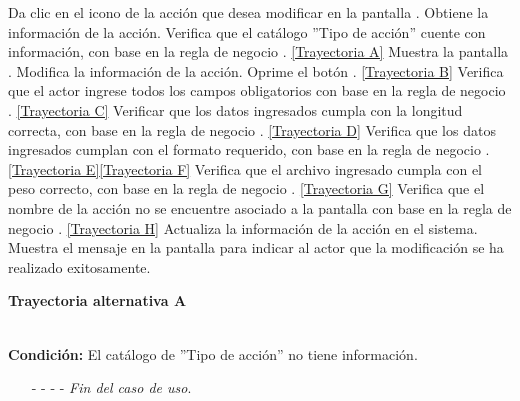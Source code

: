 \begin{UCtrayectoria}
	\UCpaso[\UCactor] Da clic en el icono \editar de la acción que desea modificar en la pantalla .
	\UCpaso[\UCsist] Obtiene la información de la acción.
	\UCpaso[\UCsist] Verifica que el catálogo ''Tipo de acción'' cuente con información, con base en la regla de negocio . \hyperlink{CU11-1-1-2:TAA}{[Trayectoria A]}
	\UCpaso[\UCsist] Muestra la pantalla .
	\UCpaso[\UCactor] Modifica la información de la acción. \label{CU11.1.2-P4}
	\UCpaso[\UCactor] Oprime el botón . \hyperlink{CU11-1-1-2:TAB}{[Trayectoria B]} 
	\UCpaso[\UCsist] Verifica que el actor ingrese todos los campos obligatorios con base en la regla de negocio . \hyperlink{CU11-1-1-2:TAC}{[Trayectoria C]}
	\UCpaso[\UCsist] Verificar que los datos ingresados cumpla con la longitud correcta, con base en la regla de negocio . \hyperlink{CU11-1-1-2:TAD}{[Trayectoria D]}
	\UCpaso[\UCsist] Verifica que los datos ingresados cumplan con el formato requerido, con base en la regla de negocio . \hyperlink{CU11-1-1-2:TAE}{[Trayectoria E]}\hyperlink{CU11-1-1-2:TAF}{[Trayectoria F]}
	\UCpaso[\UCsist] Verifica que el archivo ingresado cumpla con el peso correcto, con base en la regla de negocio . \hyperlink{CU11-1-1-2:TAG}{[Trayectoria G]}
	\UCpaso[\UCsist] Verifica que el nombre de la acción no se encuentre asociado a la pantalla con base en la regla de negocio . \hyperlink{CU11-1-1-2:TAH}{[Trayectoria H]} 
	\UCpaso[\UCsist] Actualiza la información de la acción en el sistema.
	\UCpaso[\UCsist] Muestra el mensaje  en la pantalla  para indicar al actor que la modificación se ha realizado exitosamente.
\end{UCtrayectoria}		
\hypertarget{CU11-1-1-2:TAA}{\textbf{Trayectoria alternativa A}}\\
\noindent \textbf{Condición:} El catálogo de ''Tipo de acción'' no tiene información.
\begin{enumerate}
	\UCpaso[\UCsist] Muestra el mensaje  en la pantalla  para indicar que no es posible realizar la operación debido a la falta de información necesaria para el sistema.
	\item[- -] - - {\em {Fin del caso de uso}}.%
\end{enumerate}

